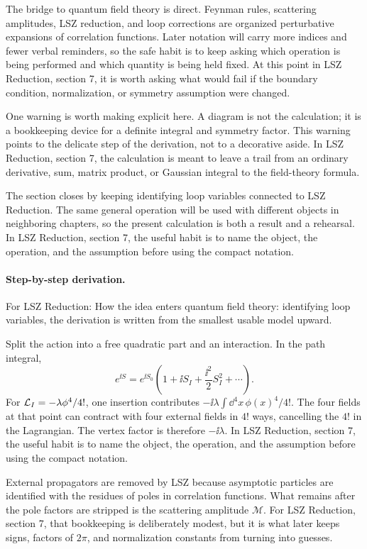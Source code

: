 The bridge to quantum field theory is direct.  Feynman rules, scattering amplitudes, LSZ reduction, and loop corrections are organized perturbative expansions of correlation functions.  Later notation will carry more indices and fewer verbal reminders, so the safe habit is to keep asking which operation is being performed and which quantity is being held fixed.  At this point in LSZ Reduction, section 7, it is worth asking what would fail if the boundary condition, normalization, or symmetry assumption were changed.

One warning is worth making explicit here.  A diagram is not the calculation; it is a bookkeeping device for a definite integral and symmetry factor.  This warning points to the delicate step of the derivation, not to a decorative aside.  In LSZ Reduction, section 7, the calculation is meant to leave a trail from an ordinary derivative, sum, matrix product, or Gaussian integral to the field-theory formula.

The section closes by keeping identifying loop variables connected to LSZ Reduction.  The same general operation will be used with different objects in neighboring chapters, so the present calculation is both a result and a rehearsal.  In LSZ Reduction, section 7, the useful habit is to name the object, the operation, and the assumption before using the compact notation.



\paragraph{Step-by-step derivation.}

For LSZ Reduction: How the idea enters quantum field theory: identifying loop variables, the derivation is written from the smallest usable model upward.

Split the action into a free quadratic part and an interaction.  In the path integral,
\[
  e^{\ii S}=e^{\ii S_0}\left(1+\ii S_I+\frac{\ii^2}{2}S_I^2+\cdots\right).
\]
For \(\mathcal L_I=-\lambda\phi^4/4!\), one insertion contributes \(-\ii\lambda\int\dd^4x\,\phi(x)^4/4!\).  The four fields at that point can contract with four external fields in \(4!\) ways, cancelling the \(4!\) in the Lagrangian.  The vertex factor is therefore \(-\ii\lambda\).  In LSZ Reduction, section 7, the useful habit is to name the object, the operation, and the assumption before using the compact notation.

External propagators are removed by LSZ because asymptotic particles are identified with the residues of poles in correlation functions.  What remains after the pole factors are stripped is the scattering amplitude \(\mathcal M\).  For LSZ Reduction, section 7, that bookkeeping is deliberately modest, but it is what later keeps signs, factors of \(2\pi\), and normalization constants from turning into guesses.

